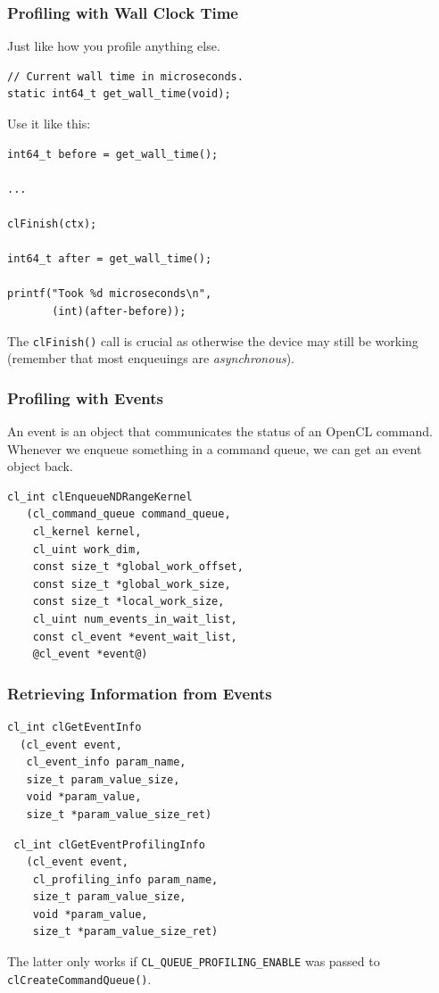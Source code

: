 \documentclass{beamer}
\begin{document}
\begin{frame}
  \frametitle{Profiling with Wall Clock Time}

Just like how you profile anything else.

\begin{lstlisting}
// Current wall time in microseconds.
static int64_t get_wall_time(void);
\end{lstlisting}

Use it like this:

\begin{lstlisting}
int64_t before = get_wall_time();

...

clFinish(ctx);

int64_t after = get_wall_time();

printf("Took %d microseconds\n",
       (int)(after-before));
\end{lstlisting}

The \lstinline{clFinish()} call is crucial as otherwise the device may
still be working (remember that most enqueuings are
\textit{asynchronous}).

\end{frame}

\begin{frame}[fragile]
  \frametitle{Profiling with Events}

  An event is an object that communicates the status of an OpenCL
  command.  Whenever we enqueue something in a command queue, we can
  get an event object back.

\begin{lstlisting}[backgroundcolor=\color{lightgray}]
 cl_int clEnqueueNDRangeKernel
   (cl_command_queue command_queue,
    cl_kernel kernel,
    cl_uint work_dim,
    const size_t *global_work_offset,
    const size_t *global_work_size,
    const size_t *local_work_size,
    cl_uint num_events_in_wait_list,
    const cl_event *event_wait_list,
    @cl_event *event@)
\end{lstlisting}

\end{frame}

\begin{frame}[fragile]
  \frametitle{Retrieving Information from Events}

\begin{lstlisting}[backgroundcolor=\color{lightgray}]
cl_int clGetEventInfo
  (cl_event event,
   cl_event_info param_name,
   size_t param_value_size,
   void *param_value,
   size_t *param_value_size_ret)
\end{lstlisting}

\begin{lstlisting}
 cl_int clGetEventProfilingInfo
   (cl_event event,
    cl_profiling_info param_name,
    size_t param_value_size,
    void *param_value,
    size_t *param_value_size_ret)
\end{lstlisting}

  The latter only works if \lstinline{CL_QUEUE_PROFILING_ENABLE} was
  passed to \lstinline{clCreateCommandQueue()}.
\end{frame}
\end{document}
